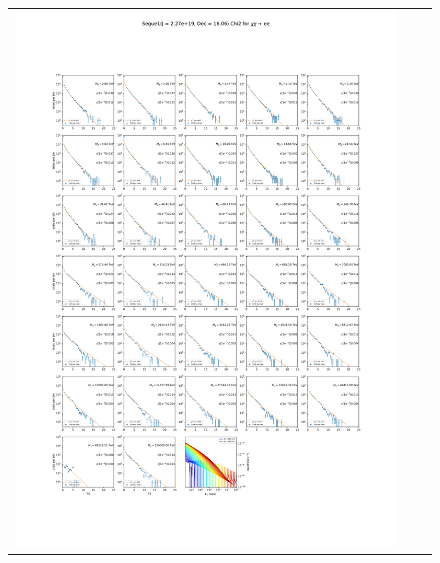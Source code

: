 \begin{figure}[t]
{\begin{tabular}{ccc}
            \includegraphics[clip, trim=22.1cm 6.5cm 19.5cm 56.5cm, scale=0.55]{figures/ic_DM/dm_plots/Segue1_ee_chi2_Masspanel_2024-03-23.pdf} &

\end{tabular}}
\end{figure}
